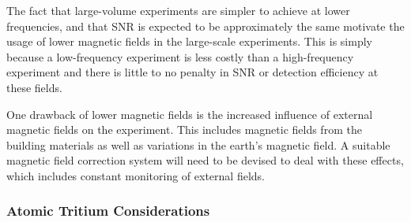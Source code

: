 The fact that large-volume experiments are simpler to achieve at lower frequencies, and that SNR is expected to be approximately the same motivate the usage of lower magnetic fields in the large-scale experiments. This is simply because a low-frequency experiment is less costly than a high-frequency experiment and there is little to no penalty in SNR or detection efficiency at these fields.

One drawback of lower magnetic fields is the increased influence of external magnetic fields on the experiment. This includes magnetic fields from the building materials as well as variations in the earth's magnetic field. A suitable magnetic field correction system will need to be devised to deal with these effects, which includes constant monitoring of external fields.

\subsubsection*{Atomic Tritium Considerations}

